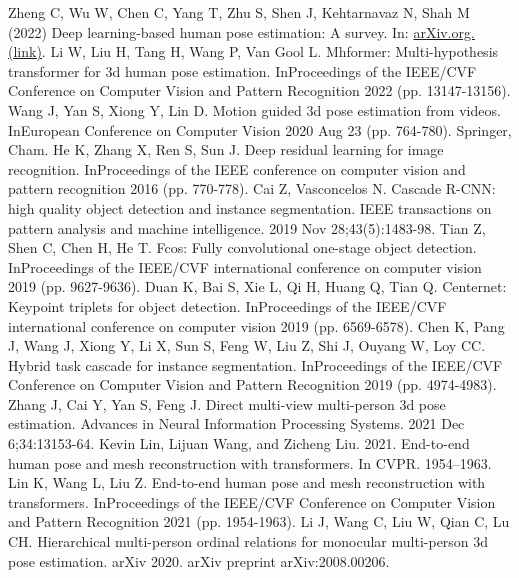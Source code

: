 \documentclass[runningheads]{llncs}
\begin{document}

\begin{thebibliography}{8}
   Zheng C, Wu W, Chen C, Yang T, Zhu S, Shen J, Kehtarnavaz N, Shah M (2022) Deep learning-based human pose estimation: A survey. In: \href{https://arxiv.org/abs/2012.13392}{arXiv.org. (link)}.
   Li W, Liu H, Tang H, Wang P, Van Gool L. Mhformer: Multi-hypothesis transformer for 3d human pose estimation. InProceedings of the IEEE/CVF Conference on Computer Vision and Pattern Recognition 2022 (pp. 13147-13156).
   Wang J, Yan S, Xiong Y, Lin D. Motion guided 3d pose estimation from videos. InEuropean Conference on Computer Vision 2020 Aug 23 (pp. 764-780). Springer, Cham. %
   He K, Zhang X, Ren S, Sun J. Deep residual learning for image recognition. InProceedings of the IEEE conference on computer vision and pattern recognition 2016 (pp. 770-778).
   Cai Z, Vasconcelos N. Cascade R-CNN: high quality object detection and instance segmentation. IEEE transactions on pattern analysis and machine intelligence. 2019 Nov 28;43(5):1483-98.
   Tian Z, Shen C, Chen H, He T. Fcos: Fully convolutional one-stage object detection. InProceedings of the IEEE/CVF international conference on computer vision 2019 (pp. 9627-9636).
   Duan K, Bai S, Xie L, Qi H, Huang Q, Tian Q. Centernet: Keypoint triplets for object detection. InProceedings of the IEEE/CVF international conference on computer vision 2019 (pp. 6569-6578).
   Chen K, Pang J, Wang J, Xiong Y, Li X, Sun S, Feng W, Liu Z, Shi J, Ouyang W, Loy CC. Hybrid task cascade for instance segmentation. InProceedings of the IEEE/CVF Conference on Computer Vision and Pattern Recognition 2019 (pp. 4974-4983).
   Zhang J, Cai Y, Yan S, Feng J. Direct multi-view multi-person 3d pose estimation. Advances in Neural Information Processing Systems. 2021 Dec 6;34:13153-64.
   Kevin Lin, Lijuan Wang, and Zicheng Liu. 2021. End-to-end human pose and mesh reconstruction with transformers. In CVPR. 1954–1963.
   Lin K, Wang L, Liu Z. End-to-end human pose and mesh reconstruction with transformers. InProceedings of the IEEE/CVF Conference on Computer Vision and Pattern Recognition 2021 (pp. 1954-1963).
   Li J, Wang C, Liu W, Qian C, Lu CH. Hierarchical multi-person ordinal relations for monocular multi-person 3d pose estimation. arXiv 2020. arXiv preprint arXiv:2008.00206.

\end{thebibliography}
\end{document}
